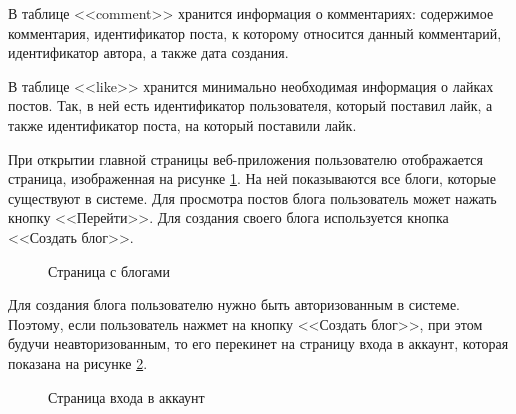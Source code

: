 \documentclass[a4paper, 14pt]{extarticle}
\begin{document}
В таблице <<comment>> хранится информация о комментариях: содержимое
комментария, идентификатор поста, к которому относится данный комментарий,
идентификатор автора, а также дата создания.

В таблице <<like>> хранится минимально необходимая информация о лайках постов.
Так, в ней есть идентификатор пользователя, который поставил лайк, а также
идентификатор поста, на который поставили лайк.

При открытии главной страницы веб-приложения пользователю отображается страница,
изображенная на рисунке \ref{fig:blogs.png}. На ней показываются все блоги,
которые существуют в системе. Для просмотра постов блога пользователь может
нажать кнопку <<Перейти>>. Для создания своего блога используется кнопка
<<Создать блог>>.

\begin{figure}[H]
  \centering
  \caption{Страница с блогами}
  \label{fig:blogs.png}
\end{figure}

Для создания блога пользователю нужно быть авторизованным в системе. Поэтому,
если пользователь нажмет на кнопку <<Создать блог>>, при этом будучи
неавторизованным, то его перекинет на страницу входа в аккаунт, которая показана
на рисунке \ref{fig:login.png}.

\begin{figure}[H]
  \centering
  \caption{Страница входа в аккаунт}
  \label{fig:login.png}
\end{figure}
\end{document}
